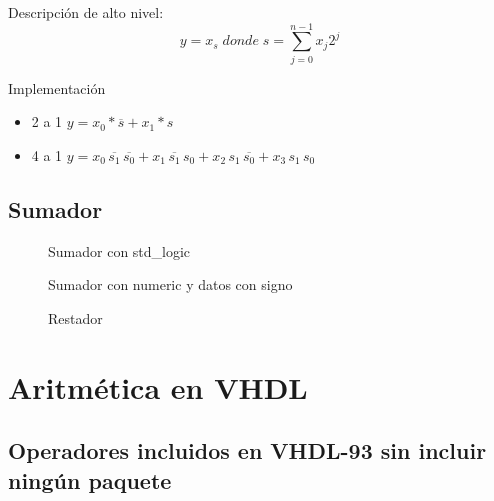 Descripción de alto nivel:
\[
    y = x_{s} \; donde \; s=\sum^{n-1}_{j=0} x_{j}2^{j}
\]

Implementación
\begin{itemize}
    \item 2 a 1 $y = x_{0} * \overline{s} + x_{1} * s$
    \item 4 a 1 $y = x_{0}\,\overline{s_{1}}\,\overline{s_{0}} + x_{1}\,\overline{s_{1}} \,s_{0} + x_{2}\,s_{1}\,\overline{s_{0}} + x_{3}\,s_{1}\,s_{0}$
\end{itemize}

\begin{figure}[H]
    \centering
    
\end{figure}
\newpage
\subsection{Sumador}
\begin{multicols}{2}
    \begin{figure}[H]
        \centering
        
        \caption{Sumador con std\_logic}
    \end{figure}
    \vfill
    \null
    \begin{figure}[H]
        \centering
        
        \caption{Sumador con numeric y datos con signo}
    \end{figure}
\end{multicols}

\begin{figure}[H]
    \centering
    
    \caption{Restador}
\end{figure}


\section{Aritmética en VHDL}
\subsection{Operadores incluidos en VHDL-93 sin incluir ningún paquete}
